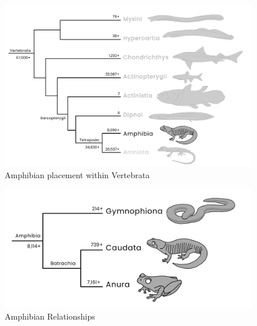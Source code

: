 \documentclass[a4paper,12pt]{article}
\begin{document}
%
%

\pagestyle{fancyplain}
\fancyhf{}
\thispagestyle{plain}

\begin{figure}[H]
\centering
  \includegraphics[scale=0.4]{Vertebrata_amphib_tre.pdf}
  \caption{Amphibian placement within Vertebrata}
  \label{fig:Vertebrates2}
\end{figure}

\begin{figure}[H]
\centering
  \includegraphics[scale=0.4]{Amphibia_tre.pdf}
  \caption{Amphibian Relationships}
  \label{fig:Amphibia}
\end{figure}
\end{document}
